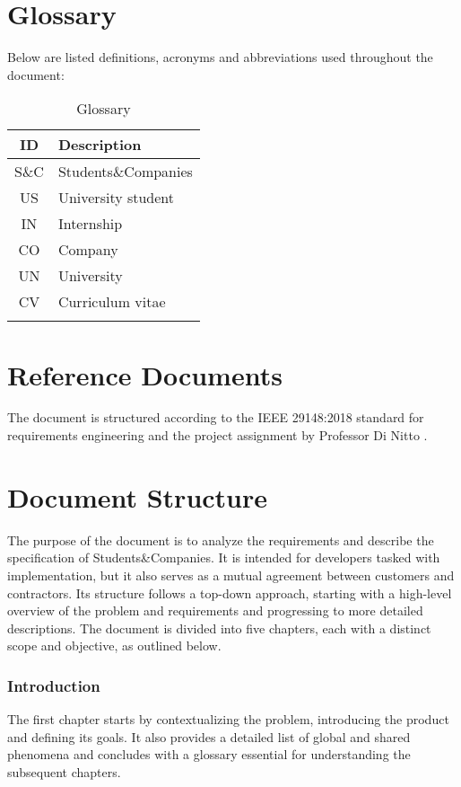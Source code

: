\section{Glossary}
Below are listed definitions, acronyms and abbreviations used throughout the document:

\renewcommand{\arraystretch}{1.5}
\begin{longtable}{|c|p{8.5cm}|}
    \hline \rowcolor{polimiblue!40}
    \textbf{ID} & \textbf{Description} \\ \hline
    S\&C & Students\&Companies \\ \hline
    US & University student \\ \hline
    IN & Internship \\ \hline
    CO & Company \\ \hline
    UN & University \\ \hline
    CV & Curriculum vitae \\ \hline
\caption{Glossary}
\end{longtable}

\section{Reference Documents}
The document is structured according to the IEEE 29148:2018 standard for requirements engineering \cite{ieee2018} and the project assignment by Professor Di Nitto \cite{project2024}.

\section{Document Structure}
The purpose of the document is to analyze the requirements and describe the specification of Students\&Companies.
It is intended for developers tasked with implementation, but it also serves as a mutual agreement between customers and contractors.
Its structure follows a top-down approach, starting with a high-level overview of the problem and requirements and progressing to more detailed descriptions.
The document is divided into five chapters, each with a distinct scope and objective, as outlined below.

\subsubsection{Introduction}
The first chapter starts by contextualizing the problem, introducing the product and defining its goals.
It also provides a detailed list of global and shared phenomena and concludes with a glossary essential for understanding the subsequent chapters.

